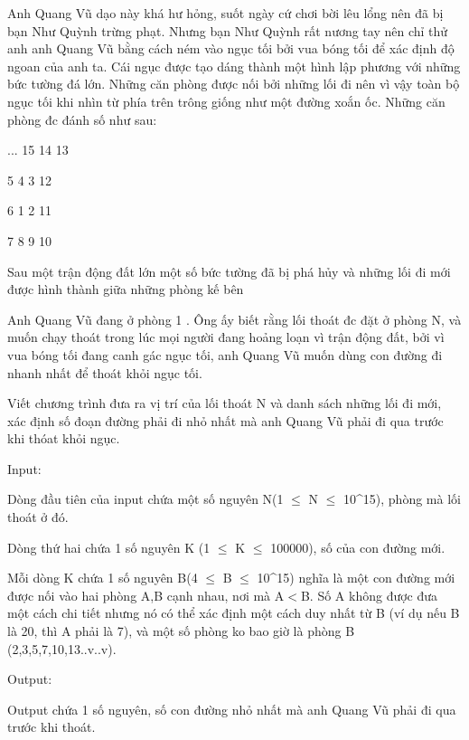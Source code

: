 



   Anh Quang Vũ dạo này khá hư hỏng, suốt ngày cứ chơi bời lêu lổng nên đã bị bạn Như Quỳnh trừng phạt. Nhưng bạn Như Quỳnh rất nương tay nên chỉ thử anh anh Quang Vũ bằng cách ném vào ngục tối bởi vua bóng tối để xác định độ ngoan của anh ta. Cái ngục được tạo dáng thành một hình lập phương với những bức tường đá lớn. Những căn phòng được nối bởi những lối đi nên vì vậy toàn bộ ngục tối khi nhìn từ phía trên trông giống như một đường xoắn ốc. Những căn phòng đc đánh số như sau:  



   ... 15  14  13  

   5   4    3  12  

   6   1    2  11  

   7   8    9  10  





   Sau một trận động đất lớn một số bức tường đã bị phá hủy và những lối đi mới được hình thành giữa những phòng kế bên  

   Anh Quang Vũ đang ở phòng 1 . Ông ấy biết rằng lối thoát đc đặt ở phòng N, và muốn chạy thoát trong lúc mọi người đang hoảng loạn vì trận động đất, bởi vì vua bóng tối đang canh gác ngục tối, anh Quang Vũ muốn dùng con đường đi nhanh nhất để thoát khỏi ngục tối.  

   Viết chương trình đưa ra vị trí của lối thoát N và danh sách những lối đi mới, xác định số đoạn đường phải đi nhỏ nhất mà anh Quang Vũ phải đi qua trước khi thóat khỏi ngục.  

            Input:         



   Dòng đầu tiên của input chứa một số nguyên N(1 $\le$ N $\le$ 10\textasciicircum15), phòng mà lối thoát ở đó.  

   Dòng thứ hai chứa 1 số nguyên K (1 $\le$ K $\le$ 100000), số của con đường mới.  

   Mỗi dòng K chứa 1 số nguyên B(4 $\le$ B $\le$ 10\textasciicircum15) nghĩa là một con đường mới được nối vào hai phòng A,B cạnh nhau, nơi mà A$<$B. Số A không được đưa một cách chi tiết nhưng nó có thể xác định một cách duy nhất từ B (ví dụ nếu B là 20, thì A phải là 7), và một số phòng ko bao giờ là phòng B (2,3,5,7,10,13..v..v).  

            Output:         



   Output chứa 1 số nguyên, số con đường nhỏ nhất mà anh Quang Vũ phải đi qua trước khi thoát.  

